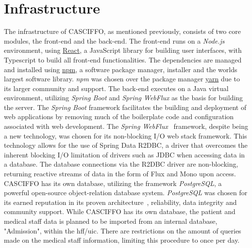 \section{Infrastructure}
\label{sec:infrastructure}
The infrastructure of CASCIFFO, as mentioned previously, consists of two core modules, the front-end and the back-end.  
The front-end runs on a \textit{Node.js} environment, using \href{https://reactjs.org/}{React}, a JavaScript library for building user interfaces,  with Typescript to build all front-end functionalities. The dependencies are managed and installed using \href{https://docs.npmjs.com/about-npm}{npm}, a software package manager, installer and the worlds largest software library. \textit{npm} was chosen over the package manager \href{https://yarnpkg.com/}{yarn} due to its larger community and support.
The back-end executes on a Java virtual environment, utilizing \textit{Spring Boot} and \textit{Spring WebFlux} as the basis for building the server. The \textit{Spring Boot} framework facilitates the building and deployment of web applications by removing much of the boilerplate code and configuration associated with web development. The \textit{Spring WebFlux}~\cite{spring-webflux} framework, despite being a new technology, was chosen for its non-blocking I/O web stack framework. This technology allows for the use of Spring Data R2DBC, a driver that overcomes the inherent blocking I/O limitation of drivers such as JDBC when accessing data in a database. The database connections via the R2DBC driver are non-blocking, returning reactive streams of data in the form of Flux and Mono upon access.
CASCIFFO has its own database, utilizing the framework \textit{PostgreSQL}, a powerful open-source object-relation database system. \textit{PostgreSQL} was chosen for its earned reputation in its proven architecture~\cite{postgresql}, reliability, data integrity and community support. While CASCIFFO has its own database, the patient and medical staff data is planned to be imported from an internal database, "Admission", within the \acrshort{hff}/\acrshort{uic}. There are restrictions on the amount of queries made on the medical staff information, limiting this procedure to once per day.


